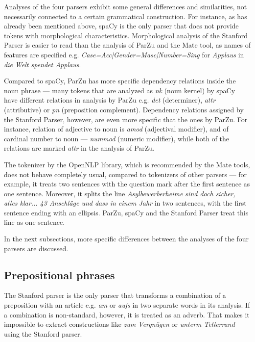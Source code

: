 Analyses of the four parsers exhibit some general differences and similarities, not necessarily connected to a certain grammatical construction. For instance, as has already been mentioned above, spaCy is the only parser that does not provide tokens with morphological characteristics. Morphological analysis of the Stanford Parser is easier to read than the analysis of ParZu and the Mate tool, as names of features are specified e.g. \textit{Case=Acc|Gender=Masc|Number=Sing} for \textit{Applaus} in \textit{die Welt spendet Applaus}. 

Compared to spaCy, ParZu has more specific dependency relations inside the noun phrase --- many tokens that are analyzed as \textit{nk} (noun kernel) by spaCy have different relations in analysis by ParZu e.g. \textit{det} (determiner), \textit{attr} (attributive) or \textit{pn} (preposition complement). Dependency relations assigned by the Stanford Parser, however, are even more specific that the ones by ParZu. For instance, relation of adjective to noun is \textit{amod} (adjectival modifier), and of cardinal number to noun --- \textit{nummod} (numeric modifier), while both of the relations are marked \textit{attr} in the analysis of ParZu. 

The tokenizer by the OpenNLP library, which is recommended by the Mate tools, does not behave completely usual, compared to tokenizers of other parsers --- for example, it treats two sentences with the question mark after the first sentence as one sentence. Moreover, it splits the line \textit{Asylbewerberheime sind doch sicher, alles klar... 43 Anschläge und dass in einem Jahr} in two sentences, with the first sentence ending with an ellipsis. ParZu, spaCy and the Stanford Parser treat this line as one sentence.

In the next subsections, more specific differences between the analyses of the four parsers are discussed.

\subsection{Prepositional phrases}

The Stanford parser is the only parser that transforms a combination of a preposition with an article e.g. \textit{am} or \textit{aufs} in two separate words in its analysis. If a combination is non-standard, however, it is treated as an adverb. That makes it impossible to extract constructions like \textit{zum Vergnügen} or \textit{unterm Tellerrand} using the Stanford parser.

